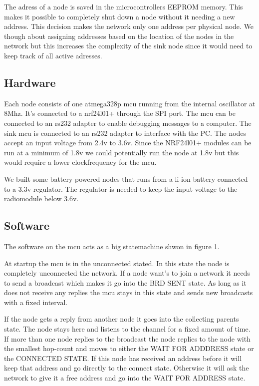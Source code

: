 \documentclass[a4paper,11pt]{article}
\begin{document}
The adress of a node is saved in the microcontrollers EEPROM memory.
This makes it possible to completely shut down a node without it 
needing a new address. This decision makes the network only one 
address per physical node. We though about assigning addresses based
on the location of the nodes in the network but this increases 
the complexity of the sink node since it would need to keep track of
all active adresses.

\subsection{Hardware}
Each node consists of one atmega328p mcu running from the
internal oscillator at 8Mhz. It's connected to a nrf24l01+ through the
SPI port. The mcu can be connected to an rs232 adapter to enable
debugging messages to a computer. The sink mcu is connected to an
rs232 adapter to interface with the PC. The nodes accept an input
voltage from 2.4v to 3.6v. Since the NRF24l01+ modules can be run at a
minimum of 1.8v we could potentially run the node at 1.8v but this
would require a lower clockfrequency for the mcu. 

We built some battery powered nodes that runs from a li-ion battery
connected to a 3.3v regulator. The regulator is needed to keep the 
input voltage to the radiomodule below 3.6v.



\subsection{Software}
The software on the mcu acts as a big statemachine shwon in figure 1.

At startup the mcu is in the unconnected stated. In this state the
node is completely unconnected the network. If a node want's to join a
network it needs to send a broadcast which makes it go into the BRD
SENT state. As long as it does not receive any replies the mcu stays
in this state and sends new broadcasts with a fixed interval.

If the node gets a reply from another node it goes into the collecting
parents state. The node stays here and listens to the channel for a
fixed amount of time. If more than one node replies to the broadcast
the node replies to the node with the smallest hop-count and moves to
either the WAIT FOR ADDDRESS state or the CONNECTED STATE. If this
node has received an address before it will keep that address and go
directly to the connect state. Otherwise it will ask the network to
give it a free address and go into the WAIT FOR ADDRESS state.
\end{document}
